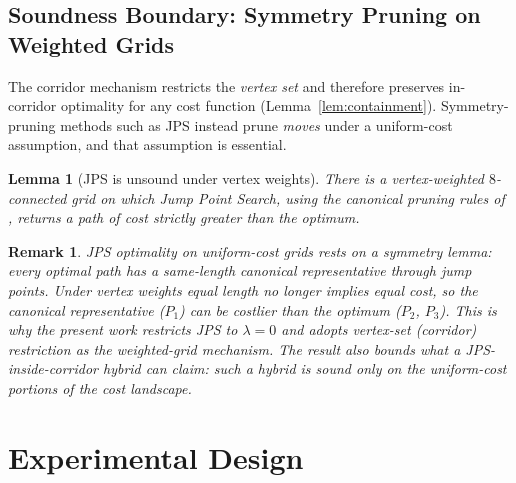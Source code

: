 \documentclass[preprint,12pt,authoryear]{elsarticle}
\newtheorem{lemma}{Lemma}
\newtheorem{remark}{Remark}
\begin{document}
\subsection{Soundness Boundary: Symmetry Pruning on Weighted Grids}\label{subsec:jps_boundary}

The corridor mechanism restricts the \emph{vertex set} and therefore preserves in-corridor optimality for any cost function (Lemma~\ref{lem:containment}). Symmetry-pruning methods such as JPS instead prune \emph{moves} under a uniform-cost assumption, and that assumption is essential.

\begin{lemma}[JPS is unsound under vertex weights]\label{lem:jps_unsound}
There is a vertex-weighted $8$-connected grid on which Jump Point Search, using the canonical pruning rules of \citet{Harabor2011}, returns a path of cost strictly greater than the optimum.
\end{lemma}

\begin{remark}
JPS optimality on uniform-cost grids rests on a symmetry lemma: every optimal path has a same-\emph{length} canonical representative through jump points. Under vertex weights equal length no longer implies equal cost, so the canonical representative ($P_1$) can be costlier than the optimum ($P_2$, $P_3$). This is why the present work restricts JPS to $\lambda = 0$ and adopts vertex-set (corridor) restriction as the weighted-grid mechanism. The result also bounds what a JPS-inside-corridor hybrid can claim: such a hybrid is sound only on the uniform-cost portions of the cost landscape.
\end{remark}

\section{Experimental Design}\label{sec:experiments}
\end{document}
